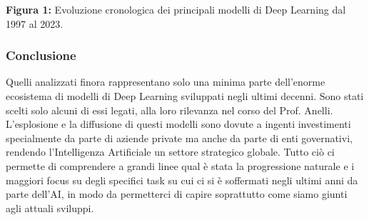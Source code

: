 \begin{center}
    
    \vspace{0.5em}
    \textbf{Figura 1:} Evoluzione cronologica dei principali modelli di Deep Learning dal 1997 al 2023.
\end{center}

\subsubsection{Conclusione}

Quelli analizzati finora rappresentano solo una minima parte dell'enorme ecosistema di modelli di Deep Learning sviluppati negli ultimi decenni. Sono stati scelti solo alcuni di essi legati, alla loro rilevanza nel corso del Prof. Anelli. L'esplosione e la diffusione di questi modelli sono dovute a ingenti investimenti specialmente da parte di aziende private ma anche da parte di enti governativi, rendendo l'Intelligenza Artificiale un settore strategico globale. Tutto ciò ci permette di comprendere a grandi linee qual è stata la progressione naturale e i maggiori focus su degli specifici task su cui ci si è soffermati negli ultimi anni da parte dell'AI, in modo da permetterci di capire soprattutto come siamo giunti agli attuali sviluppi.

